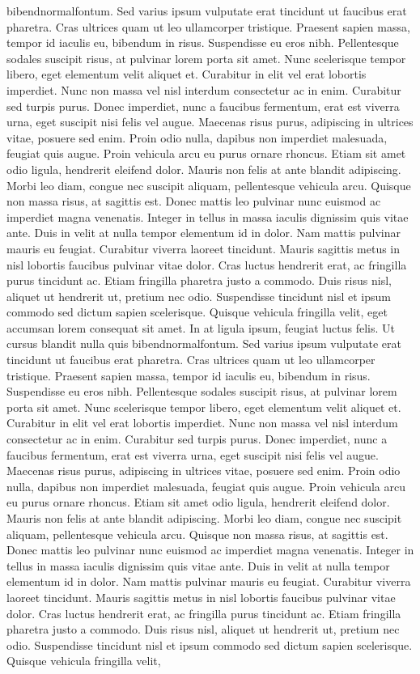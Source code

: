 \documentclass[letterpaper, twoside, 12pt,these,creativecommons,hyperref]{thETS}
\begin{document}
\begin{introduction}
bibendnormalfontum. Sed varius ipsum vulputate erat tincidunt ut faucibus erat pharetra. Cras ultrices quam ut leo ullamcorper tristique. Praesent sapien massa, tempor id iaculis eu, bibendum in risus. Suspendisse eu eros nibh. Pellentesque sodales suscipit risus, at pulvinar lorem porta sit amet. Nunc scelerisque tempor libero, eget elementum velit aliquet et. Curabitur in elit vel erat lobortis imperdiet. Nunc non massa vel nisl interdum consectetur ac in enim. Curabitur sed turpis purus. Donec imperdiet, nunc a faucibus fermentum, erat est viverra urna, eget suscipit nisi felis vel augue. Maecenas risus purus, adipiscing in ultrices vitae, posuere sed enim. Proin odio nulla, dapibus non imperdiet malesuada, feugiat quis augue. Proin vehicula arcu eu purus ornare rhoncus. Etiam sit amet odio ligula, hendrerit eleifend dolor. Mauris non felis at ante blandit adipiscing. Morbi leo diam, congue nec suscipit aliquam, pellentesque vehicula arcu. Quisque non massa risus, at sagittis est. Donec mattis leo pulvinar nunc euismod ac imperdiet magna venenatis. Integer in tellus in massa iaculis dignissim quis vitae ante. Duis in velit at nulla tempor elementum id in dolor. Nam mattis pulvinar mauris eu feugiat. Curabitur viverra laoreet tincidunt. Mauris sagittis metus in nisl lobortis faucibus pulvinar vitae dolor. Cras luctus hendrerit erat, ac fringilla purus tincidunt ac. Etiam fringilla pharetra justo a commodo. Duis risus nisl, aliquet ut hendrerit ut, pretium nec odio. Suspendisse tincidunt nisl et ipsum commodo sed dictum sapien scelerisque. Quisque vehicula fringilla velit, eget accumsan lorem consequat sit amet. In at ligula ipsum, feugiat luctus felis. Ut cursus blandit nulla quis bibendnormalfontum. Sed varius ipsum vulputate erat tincidunt ut faucibus erat pharetra. Cras ultrices quam ut leo ullamcorper tristique. Praesent sapien massa, tempor id iaculis eu, bibendum in risus. Suspendisse eu eros nibh. Pellentesque sodales suscipit risus, at pulvinar lorem porta sit amet. Nunc scelerisque tempor libero, eget elementum velit aliquet et. Curabitur in elit vel erat lobortis imperdiet. Nunc non massa vel nisl interdum consectetur ac in enim. Curabitur sed turpis purus. Donec imperdiet, nunc a faucibus fermentum, erat est viverra urna, eget suscipit nisi felis vel augue. Maecenas risus purus, adipiscing in ultrices vitae, posuere sed enim. Proin odio nulla, dapibus non imperdiet malesuada, feugiat quis augue. Proin vehicula arcu eu purus ornare rhoncus. Etiam sit amet odio ligula, hendrerit eleifend dolor. Mauris non felis at ante blandit adipiscing. Morbi leo diam, congue nec suscipit aliquam, pellentesque vehicula arcu. Quisque non massa risus, at sagittis est. Donec mattis leo pulvinar nunc euismod ac imperdiet magna venenatis. Integer in tellus in massa iaculis dignissim quis vitae ante. Duis in velit at nulla tempor elementum id in dolor. Nam mattis pulvinar mauris eu feugiat. Curabitur viverra laoreet tincidunt. Mauris sagittis metus in nisl lobortis faucibus pulvinar vitae dolor. Cras luctus hendrerit erat, ac fringilla purus tincidunt ac. Etiam fringilla pharetra justo a commodo. Duis risus nisl, aliquet ut hendrerit ut, pretium nec odio. Suspendisse tincidunt nisl et ipsum commodo sed dictum sapien scelerisque. Quisque vehicula fringilla velit, 
\end{introduction}
\end{document}
